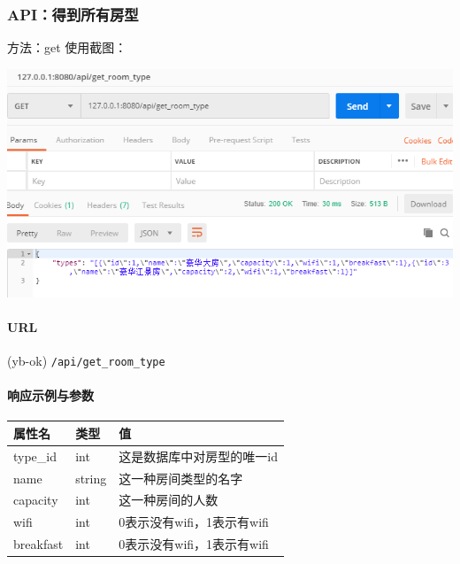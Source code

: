 \documentclass[]{article}
\let\oldparagraph\paragraph
\renewcommand{\paragraph}[1]{\oldparagraph{#1}\mbox{}}
\begin{document}
\hypertarget{apiux5f97ux5230ux6240ux6709ux623fux578b}{%
\subsubsection{API：得到所有房型}\label{apiux5f97ux5230ux6240ux6709ux623fux578b}}

方法：get 使用截图：

\includegraphics{figure/1544965249259.png}

\hypertarget{url-12}{%
\paragraph{URL}\label{url-12}}

(yb-ok) \texttt{/api/get\_room\_type}

\hypertarget{ux54cdux5e94ux793aux4f8bux4e0eux53c2ux6570-7}{%
\paragraph{响应示例与参数}\label{ux54cdux5e94ux793aux4f8bux4e0eux53c2ux6570-7}}

\begin{Shaded}
\begin{Highlighting}[]
\FunctionTok{\{}
    \FunctionTok{:}\OtherTok{[}
        \ErrorTok{:}\OtherTok{,}
        \ErrorTok{:}\OtherTok{,}
        \ErrorTok{:}\OtherTok{,}
        \ErrorTok{:}\OtherTok{,}
        \ErrorTok{:}
    \OtherTok{]}
\FunctionTok{\}}
\end{Highlighting}
\end{Shaded}

\begin{longtable}[]{@{}lll@{}}
\toprule
属性名 & 类型 & 值\tabularnewline
\midrule
\endhead
type\_id & int & 这是数据库中对房型的唯一id\tabularnewline
name & string & 这一种房间类型的名字\tabularnewline
capacity & int & 这一种房间的人数\tabularnewline
wifi & int & 0表示没有wifi，1表示有wifi\tabularnewline
breakfast & int & 0表示没有wifi，1表示有wifi\tabularnewline
\bottomrule
\end{longtable}
\end{document}
